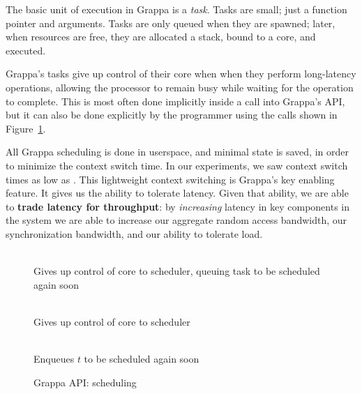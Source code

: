 The basic unit of execution in Grappa is a {\em task}. Tasks are
small; just a function pointer and arguments. Tasks are only
queued when they are spawned; later, when resources are free, they are
allocated a stack, bound to a core, and executed.

Grappa's tasks give up control of their core when when they perform
long-latency operations, allowing the processor to remain busy while
waiting for the operation to complete. This is most often done
implicitly inside a call into Grappa's API, but it can also be done
explicitly by the programmer using the calls shown in
Figure~\ref{fig:scheduling}. 

All Grappa scheduling is done in userspace, and minimal state is saved,
in order to minimize the context switch time. In our experiments, we saw
context switch times as low as . This lightweight context
switching is Grappa's key enabling feature. It gives us the ability to
tolerate latency. Given that ability, we are able to \textbf{trade
latency for throughput}: by {\em increasing} latency in key components
in the system we are able to increase our aggregate random access
bandwidth, our synchronization bandwidth, and our ability to tolerate
load.

\begin{figure}[htbp]
  \begin{center}
    \begin{description}\small
    \item[ \texttt{ yield() } ] \hfill \\
      Gives up control of core to scheduler, queuing task to be scheduled again soon
    \item[ \texttt{ suspend() } ] \hfill \\
      Gives up control of core to scheduler
    \item[ \texttt{ wake( task * $t$ ) } ] \hfill \\
      Enqueues $t$ to be scheduled again soon
    \end{description}
    \begin{minipage}{0.95\columnwidth}
      \caption{\label{fig:scheduling} Grappa API: scheduling} %
    \end{minipage}
  \end{center}
\end{figure}


